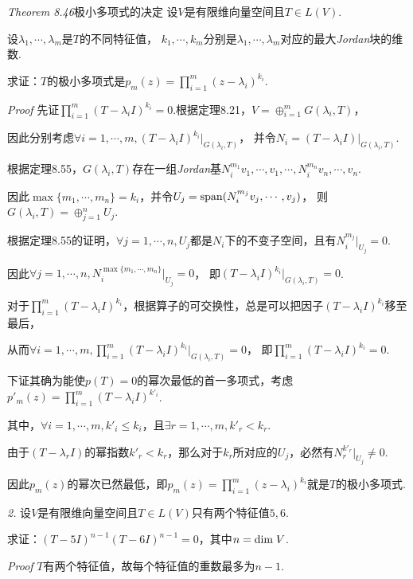 \textit{Theorem 8.46}{\kaishu 极小多项式的决定}
设\(V\)是有限维向量空间且\(T \in L(V)\).

设\(\lambda_1,\cdots,\lambda_m\)是\(T\)的不同特征值，
\(k_1,\cdots,k_m\)分别是\(\lambda_1,\cdots,\lambda_m\)对应的最大\textit{Jordan}块的维数.

求证：\(T\)的极小多项式是\(p_m(z)=\prod_{i=1}^m (z-\lambda_i)^{k_i}\).

\textit{Proof}
先证\(\prod_{i=1}^m (T-\lambda_i I)^{k_i}=0\).根据定理8.21，\(V=\oplus_{i=1}^m G(\lambda_i,T)\)，

因此分别考虑\(\forall i=1,\cdots,m,(T-\lambda_i I)^{k_i}|_{G(\lambda_i,T)}\)，
并令\(N_i=(T-\lambda_i I)|_{G(\lambda_i,T)}\).

根据定理8.55，\(G(\lambda_i,T)\)存在一组\textit{Jordan}基\(N_i^{m_1}v_1,\cdots,v_1,\cdots,N_i^{m_n}v_n,\cdots,v_n\).

因此\(\max \{m_1,\cdots,m_n\}=k_i\)，并令\(U_j=\mathrm{span} (N_i^{m_j}v_j,\cdots,v_j)\)，
则\(G(\lambda_i,T)=\oplus_{j=1}^n U_j\).

根据定理8.55的证明，\(\forall j=1,\cdots,n,U_j\)都是\(N_i\)下的不变子空间，且有\(N_i^{m_j}|_{U_j}=0\).

因此\(\forall j=1,\cdots,n,N_i^{\max \{m_1,\cdots,m_n\}}|_{U_j}=0\)，
即\((T-\lambda_i I)^{k_i}|_{G(\lambda_i,T)}=0\).

对于\(\prod_{i=1}^m (T-\lambda_i I)^{k_i}\)，根据算子的可交换性，总是可以把因子\((T-\lambda_i I)^{k_i}\)移至最后，

从而\(\forall i=1,\cdots,m,\prod_{i=1}^m (T-\lambda_i I)^{k_i}|_{G(\lambda_i,T)}=0\)，
即\(\prod_{i=1}^m (T-\lambda_i I)^{k_i}=0\).

下证其确为能使\(p(T)=0\)的幂次最低的首一多项式，考虑\(p'_m(z)=\prod_{i=1}^m (T-\lambda_i I)^{k'_i}\).

其中，\(\forall i=1,\cdots,m,k'_i \leq k_i\)，且\(\exists r=1,\cdots,m,k'_r<k_r\).

由于\((T-\lambda_r I)\)的幂指数\(k'_r<k_r\)，那么对于\(k_r\)所对应的\(U_j\)，必然有\(N_r^{k'_r}|_{U_j} \ne 0\).

因此\(p_m(z)\)的幂次已然最低，即\(p_m(z)=\prod_{i=1}^m (z-\lambda_i)^{k_i}\)就是\(T\)的极小多项式.

\hspace*{\fill}

\textit{2.}
设\(V\)是有限维向量空间且\(T \in L(V)\)只有两个特征值\(5,6\).

求证：\((T-5I)^{n-1}(T-6I)^{n-1}=0\)，其中\(n=\mathrm{dim \;} V\).

\textit{Proof}
\(T\)有两个特征值，故每个特征值的重数最多为\(n-1\).

